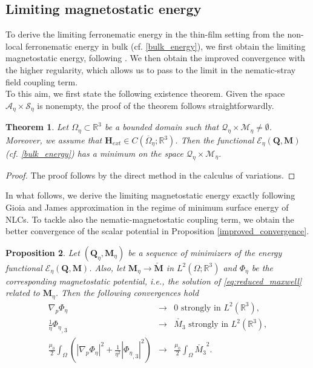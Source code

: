 \documentclass{article}
\newtheorem{theorem}{Theorem}[section]
\newtheorem{proposition}[theorem]{Proposition}
\def\Qvec{\mathbf{Q}}
\def \Mvec{\mathbf{M}}
\def\Hvec{\mathbf{H}}
\begin{document}
\subsection{Limiting magnetostatic energy}
To derive the limiting ferronematic energy in the thin-film setting from the non-local ferronematic energy in bulk (cf. \eqref{bulk_energy}), we first obtain the limiting magnetostatic energy, following \cite{Giogia}. We then obtain the improved convergence with the higher regularity, which allows us to pass to the limit in the nematic-stray field coupling term.\newline\\
To this aim, we first state the following existence theorem. Given the space $\mathcal{A}_{\eta}\times\mathcal{S}_{\eta}$ is nonempty, the proof of the theorem follows straightforwardly.
\begin{theorem}\label{th:minimizer}
Let $\Omega_{\eta}\subset\mathbb R^3$ be a bounded domain such that $\mathcal{Q}_{\eta}\times\mathcal{M}_{\eta}\ne\emptyset$. Moreover, we assume that $\Hvec_{ext}\in C\left(\overline{\Omega}_{\eta}; \mathbb R^3\right)$. Then the functional $\mathcal{E}_{\eta}\left(\Qvec, \Mvec\right)$ (cf. \eqref{bulk_energy}) has a minimum on the space $\mathcal{Q}_{\eta}\times\mathcal{M}_{\eta}$.
\end{theorem}
\begin{proof}
The proof follows by the direct method in the calculus of variations.
\end{proof}
In what follows, we derive the limiting magnetostatic energy exactly following Gioia and James approximation \cite{Giogia} in the regime of minimum surface energy of NLCs. To tackle also the nematic-magnetostatic coupling term, we obtain the better convergence of the scalar potential in Proposition \ref{improved_convergence}.
\begin{proposition}\label{prop:reduced_stray}
Let $\left(\Qvec_{\eta}, \Mvec_{\eta}\right)$ be a sequence of minimizers of the energy functional $\mathcal{E}_{\eta}\left(\Qvec, \Mvec\right)$. Also, let $\Mvec_{\eta}\rightarrow\check{\Mvec}$ in $L^2\left(\Omega; \mathbb R^3\right)$ and $\Phi_{\eta}$ be the corresponding magnetostatic potential, i.e., the solution of \eqref{eq:reduced_maxwell} related to $\Mvec_{\eta}$. Then the following convergences hold
\begin{eqnarray}
\nabla_p\Phi_{\eta}&\rightarrow& 0 \mbox{ strongly in } L^2\left(\mathbb R^3\right),\label{eq:reduced_stray1}\\
\frac{1}{\eta}{\Phi_{\eta}}_{,3}&\rightarrow& \check{M_3} \mbox{ strongly in } L^2\left(\mathbb R^3\right),\label{eq:reduced_stray2}\\
\frac{\mu_0}{2}\int_{\Omega}\left(|\nabla_p\Phi_{\eta}|^2+\frac{1}{\eta^2}|{\Phi_{\eta}}_{,3}|^2\right)&\rightarrow&\frac{\mu_0}{2}\int_{\Omega}\check{M_3}^2.\label{eq:str2'}
\end{eqnarray}
\end{proposition}
\end{document}
